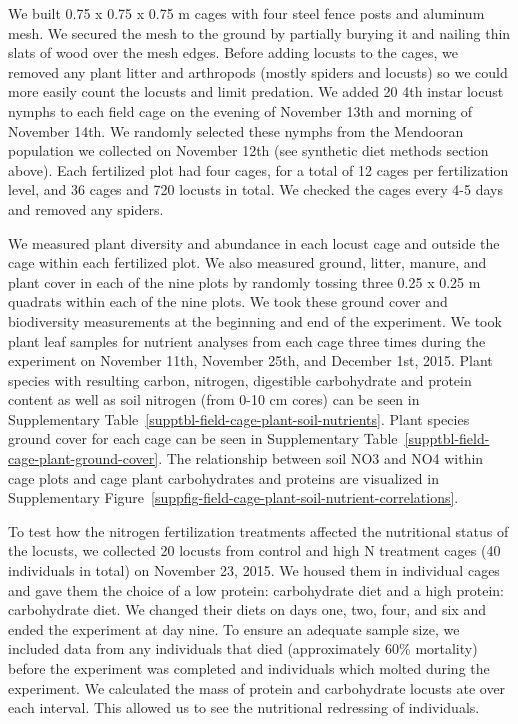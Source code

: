 \documentclass[
]{article}
\begin{document}
We built 0.75 x 0.75 x 0.75 m cages with four steel fence posts and
aluminum mesh. We secured the mesh to the ground by partially burying it
and nailing thin slats of wood over the mesh edges. Before adding
locusts to the cages, we removed any plant litter and arthropods (mostly
spiders and locusts) so we could more easily count the locusts and limit
predation. We added 20 4th instar locust nymphs to each field cage on
the evening of November 13th and morning of November 14th. We randomly
selected these nymphs from the Mendooran population we collected on
November 12th (see synthetic diet methods section above). Each
fertilized plot had four cages, for a total of 12 cages per
fertilization level, and 36 cages and 720 locusts in total. We checked
the cages every 4-5 days and removed any spiders.

We measured plant diversity and abundance in each locust cage and
outside the cage within each fertilized plot. We also measured ground,
litter, manure, and plant cover in each of the nine plots by randomly
tossing three 0.25 x 0.25 m quadrats within each of the nine plots. We
took these ground cover and biodiversity measurements at the beginning
and end of the experiment. We took plant leaf samples for nutrient
analyses from each cage three times during the experiment on November
11th, November 25th, and December 1st, 2015. Plant species with
resulting carbon, nitrogen, digestible carbohydrate and protein content
as well as soil nitrogen (from 0-10 cm cores) can be seen in
Supplementary Table~\ref{supptbl-field-cage-plant-soil-nutrients}. Plant
species ground cover for each cage can be seen in
Supplementary Table~\ref{supptbl-field-cage-plant-ground-cover}. The
relationship between soil NO3 and NO4 within cage plots and cage plant
carbohydrates and proteins are visualized in
Supplementary Figure~\ref{suppfig-field-cage-plant-soil-nutrient-correlations}.

To test how the nitrogen fertilization treatments affected the
nutritional status of the locusts, we collected 20 locusts from control
and high N treatment cages (40 individuals in total) on November 23,
2015. We housed them in individual cages and gave them the choice of a
low protein: carbohydrate diet and a high protein: carbohydrate diet. We
changed their diets on days one, two, four, and six and ended the
experiment at day nine. To ensure an adequate sample size, we included
data from any individuals that died (approximately 60\% mortality)
before the experiment was completed and individuals which molted during
the experiment. We calculated the mass of protein and carbohydrate
locusts ate over each interval. This allowed us to see the nutritional
redressing of individuals.
\end{document}
